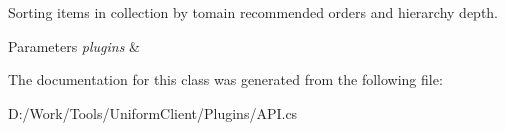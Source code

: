 Sorting items in collection by tomain recommended orders and hierarchy depth. 


\begin{DoxyParams}{Parameters}
{\em plugins} & \\
\hline
\end{DoxyParams}


The documentation for this class was generated from the following file\+:\begin{DoxyCompactItemize}
\item 
D\+:/\+Work/\+Tools/\+Uniform\+Client/\+Plugins/A\+P\+I.\+cs\end{DoxyCompactItemize}
